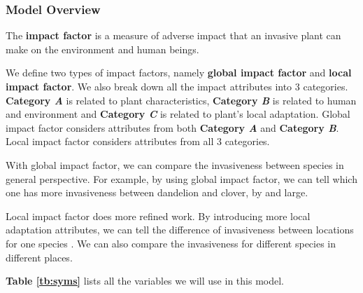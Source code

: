 \documentclass[12pt]{article}
\begin{document}
	\subsubsection{Model Overview}
		
		The \textbf{impact factor} is a measure of adverse impact that an invasive plant can make on the environment and human beings.  
		
		We define two types of impact factors, namely \textbf{global impact factor} and \textbf{local impact factor}.  We also break down all the impact attributes into 3 categories.  \textbf{Category \textit{A}} is related to plant characteristics, \textbf{Category \textit{B}} is related to human and environment and \textbf{Category \textit{C}} is related to plant's local adaptation.  Global impact factor considers attributes from both \textbf{Category \textit{A}} and \textbf{Category \textit{B}}.  Local impact factor considers attributes from all 3 categories.
		
		With global impact factor, we can compare the invasiveness between species in general perspective.  For example, by using global impact factor, we can tell which one has more invasiveness between dandelion and clover, by and large.
		
		Local impact factor does more refined work.  By introducing more local adaptation attributes, we can tell the difference of invasiveness between locations for one species .  We can also compare the invasiveness for different species in different places.
		
		\textbf{Table \ref{tb:syms}} lists all the variables we will use in this model.
		
\end{document}
